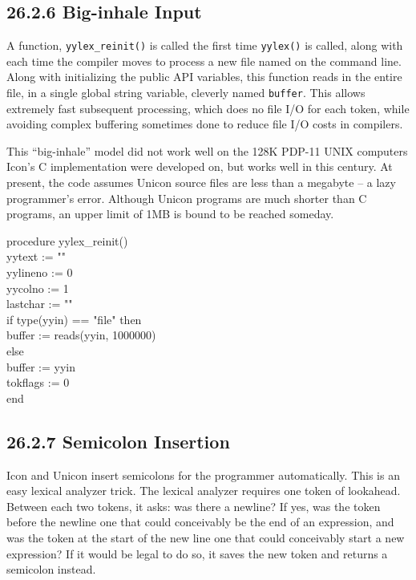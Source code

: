 \subsection[26.2.6 Big-inhale Input]{26.2.6 Big-inhale Input}


A function, \texttt{yylex\_reinit()} is called the first time
\texttt{yylex()} is called, along with each time the compiler moves to
process a new file named on the command line. Along with initializing
the public API variables, this function reads in the entire file, in a
single global string variable, cleverly named \texttt{buffer}. This
allows extremely fast subsequent processing, which does no file I/O
for each token, while avoiding complex buffering sometimes done to
reduce file I/O costs in compilers.

This ``big-inhale'' model did not work well on the 128K PDP-11 UNIX
computers Icon's C implementation were developed on, but works well in
this century. At present, the code assumes Unicon source files are
less than a megabyte -- a lazy programmer's error. Although Unicon
programs are much shorter than C programs, an upper limit of 1MB is
bound to be reached someday.

\begin{iconcode}
procedure yylex\_reinit() \\
\>   yytext := "" \\
\>   yylineno := 0 \\
\>   yycolno := 1 \\
\>   lastchar := "" \\
\>   if type(yyin) == "file" then \\
\> \>     buffer := reads(yyin, 1000000) \\
\>   else \\
\> \>     buffer := yyin \\
\>   tokflags := 0 \\
end
\end{iconcode}


\subsection[26.2.7 Semicolon Insertion]{26.2.7 Semicolon Insertion}

Icon and Unicon insert semicolons for the programmer
automatically. This is an easy lexical analyzer trick. The lexical
analyzer requires one token of lookahead. Between each two tokens, it
asks: was there a newline?  If yes, was the token before the newline
one that could conceivably be the end of an expression, and was the
token at the start of the new line one that could conceivably start a
new expression? If it would be legal to do so, it saves the new token
and returns a semicolon instead.

